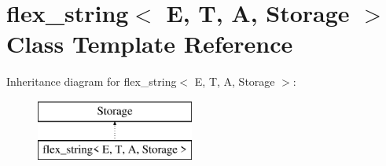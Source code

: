 \hypertarget{classflex__string}{}\section{flex\+\_\+string$<$ E, T, A, Storage $>$ Class Template Reference}
\label{classflex__string}
Inheritance diagram for flex\+\_\+string$<$ E, T, A, Storage $>$\+:\begin{figure}[H]
\begin{center}
\leavevmode
\includegraphics[height=2.000000cm]{classflex__string}
\end{center}
\end{figure}
